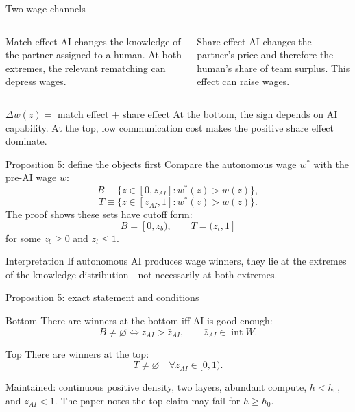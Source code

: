\documentclass[aspectratio=169,10pt]{beamer}
\newcommand{\wpre}{w}
\newcommand{\waut}{w^*}
\begin{document}
\begin{frame}{Two wage channels}
\small
\begin{columns}[T,onlytextwidth]
\begin{alertblock}{Match effect}
AI changes the knowledge of the partner assigned to a human. At both extremes, the relevant rematching can depress wages.
\end{alertblock}
\begin{block}{Share effect}
AI changes the partner's price and therefore the human's share of team surplus. This effect can raise wages.
\end{block}
\end{columns}
\vspace{.3cm}
\centering
\Large $\Delta w(z)=$ \textcolor{IDERed}{match effect} $+$ \textcolor{IDENavy}{share effect}
\vfill
At the bottom, the sign depends on AI capability. At the top, low communication cost makes the positive share effect dominate.
\end{frame}

\begin{frame}{Proposition 5: define the objects first}
\small
Compare the autonomous wage $\waut$ with the pre-AI wage $\wpre$:
\[
B\equiv\{z\in[0,z_{AI}]:\waut(z)>\wpre(z)\},
\]
\[
T\equiv\{z\in[z_{AI},1]:\waut(z)>\wpre(z)\}.
\]
The proof shows these sets have cutoff form:
\[
B=[0,z_b),\qquad T=(z_t,1]
\]
for some $z_b\ge0$ and $z_t\le1$.
\begin{block}{Interpretation}
If autonomous AI produces wage winners, they lie at the extremes of the knowledge distribution—not necessarily at both extremes.
\end{block}
\end{frame}

\begin{frame}{Proposition 5: exact statement and conditions}
\small
\begin{block}{Bottom}
There are winners at the bottom iff AI is good enough:
\[
\boxed{B\ne\varnothing\iff z_{AI}>\bar z_{AI}},
\qquad \bar z_{AI}\in\operatorname{int}W.
\]
\end{block}
\begin{alertblock}{Top}
There are winners at the top:
\[
\boxed{T\ne\varnothing\quad\forall z_{AI}\in[0,1)}.
\]
\end{alertblock}
Maintained: continuous positive density, two layers, abundant compute, $h<h_0$, and $z_{AI}<1$. The paper notes the top claim may fail for $h\ge h_0$.
\end{frame}
\end{document}
